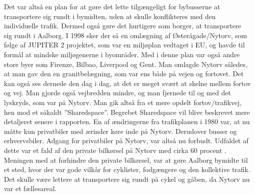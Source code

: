 Det var altså en plan for at gøre det lette tilgængeligt for bybusserne at transportere sig rundt i bymidten, uden at skulle konflikteres med den individuelle trafik. Dermed også gøre det hurtigere som borger, at transportere sig rundt i Aalborg.
I 1998 sker der så en omlægning af Østerågade/Nytorv, som følge af JUPITER 2 projektet, som var en miljøplan vedtaget i EU, og havde til formål at mindske miljøgenerne i byområder. Med i denne plan var også andre store byer som Firenze, Bilbao, Liverpool og Gent.
Man omlagde Nytorv således, at man gav den en granitbelægning, som var ens både på vejen og fortovet. Det kan også ses dernede den dag i dag, at det er meget svært at skelne mellem fortov og vej. Man gjorde også vejbredden mindre, og man fjernede til og med det lyskryds, som var på Nytorv. Man gik altså fra et mere opdelt fortov/trafikvej, hen mod et såkaldt ”Sharedspace”. Begrebet Sharedspace vil blive beskrevet mere detaljeret senere i rapporten. En af ændringerne fra trafikplanen i 1980 var, at nu måtte kun privatbiler med ærinder køre inde på Nytorv. Derudover busser og erhvervsbiler. Adgang for privatbiler på Nytorv, var altså nu forbudt. Udfaldet af dette var et fald af den private bilkørsel på Nytorv med cirka 60 procent . 
Meningen med at forhindre den private bilkørsel, var at gøre Aalborg bymidte til et sted, hvor der var gode vilkår for cyklister, fodgængere og den kollektive trafik. Det skulle være lettere at transportere sig rundt på cykel og gåben, da Nytorv nu var et fællesareal.

